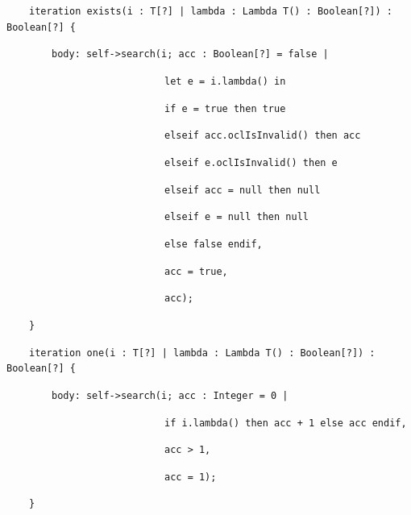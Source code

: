 \documentclass[
]{ceurart}
\begin{document}
\begin{description}[itemsep=-0.2cm]\vspace{-10pt}\small\begin{samepage}
\item ~~~~\verb!iteration exists(i : T[?] | lambda : Lambda T() : Boolean[?]) : Boolean[?] {!
\item ~~~~~~~~\verb!body: self->search(i; acc : Boolean[?] = false |!
\item ~~~~~~~~~~~~~~~~~~~~~~~~~~~~\verb!let e = i.lambda() in!
\item ~~~~~~~~~~~~~~~~~~~~~~~~~~~~\verb!if e = true then true!
\item ~~~~~~~~~~~~~~~~~~~~~~~~~~~~\verb!elseif acc.oclIsInvalid() then acc!
\item ~~~~~~~~~~~~~~~~~~~~~~~~~~~~\verb!elseif e.oclIsInvalid() then e!
\item ~~~~~~~~~~~~~~~~~~~~~~~~~~~~\verb!elseif acc = null then null!
\item ~~~~~~~~~~~~~~~~~~~~~~~~~~~~\verb!elseif e = null then null!
\item ~~~~~~~~~~~~~~~~~~~~~~~~~~~~\verb!else false endif,!
\item ~~~~~~~~~~~~~~~~~~~~~~~~~~~~\verb!acc = true,!
\item ~~~~~~~~~~~~~~~~~~~~~~~~~~~~\verb!acc);!
\item ~~~~\verb!}!
\end{samepage}\vspace{-10pt}\end{description}
\begin{description}[itemsep=-0.2cm]\vspace{-10pt}\small\begin{samepage}
\item ~~~~\verb!iteration one(i : T[?] | lambda : Lambda T() : Boolean[?]) : Boolean[?] {!
\item ~~~~~~~~\verb!body: self->search(i; acc : Integer = 0 |!
\item ~~~~~~~~~~~~~~~~~~~~~~~~~~~~\verb!if i.lambda() then acc + 1 else acc endif,!
\item ~~~~~~~~~~~~~~~~~~~~~~~~~~~~\verb!acc > 1,!
\item ~~~~~~~~~~~~~~~~~~~~~~~~~~~~\verb!acc = 1);!
\item ~~~~\verb!}!
\end{samepage}\vspace{-10pt}\end{description}
\end{document}
